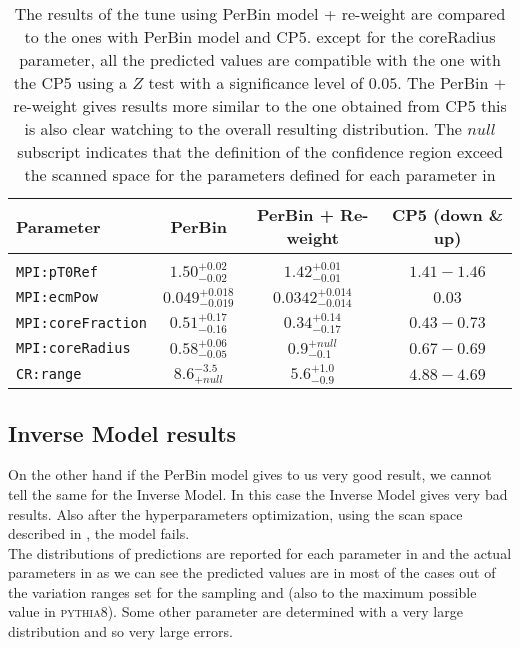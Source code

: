 \begin{table}[!htb]
\centering
	\begin{tabular}{l | c | c | c }
		Parameter & PerBin & PerBin + Re-weight & CP5 (down \& up)\\ \hline\hline
		\\[-0.85em]		
\texttt{MPI:pT0Ref} & $ 1.50^{+0.02}_{-0.02}$ & $ 1.42_{-0.01}^{+0.01} $ & $1.41 - 1.46$\\[3pt]
\texttt{MPI:ecmPow} & $ 0.049_{-0.019}^{+0.018} $ & $ 0.0342_{-0.014}^{+0.014} $ & $0.03$\\[3pt]
\texttt{MPI:coreFraction} & $ 0.51_{-0.16}^{+0.17} $ & $ 0.34_{-0.17}^{+0.14} $ & $0.43 - 0.73$\\[3pt]
\texttt{MPI:coreRadius} & $ 0.58_{-0.05}^{+0.06} $ & $ 0.9_{-0.1}^{+null} $ & $0.67 - 0.69$\\[3pt]
\texttt{CR:range} & $ 8.6 ^{-3.5}_{+null} $ & $ 5.6_{-0.9}^{+1.0} $ & $4.88 - 4.69$\\[2pt]
\end{tabular}
\caption{The results of the tune using PerBin model + re-weight are compared to the ones with PerBin model and CP5. except for the coreRadius parameter, all the predicted values are compatible with the one with the CP5 using a $Z$ test with a significance level of $0.05$. The PerBin + re-weight gives results more similar to the one obtained from CP5 this is also clear watching to the overall resulting distribution. The $null$ subscript indicates that the definition of the confidence region exceed the scanned space for the parameters defined for each parameter in }
\label{table:result_PerBin_5params_rew}
\end{table}

\clearpage
\subsection{Inverse Model results}

On the other hand if the PerBin model gives to us very good result, we cannot tell the same for the Inverse Model. In this case the Inverse Model gives very bad results. Also after the hyperparameters optimization, using the scan space described in , the model fails.
\\
The distributions of predictions are reported for each parameter in  and the actual parameters in  as we can see the predicted values are in most of the cases out of the variation ranges set for the sampling and (also to the maximum possible value in \textsc{pythia8}). 
Some other parameter are determined with a very large distribution and so very large errors. 


